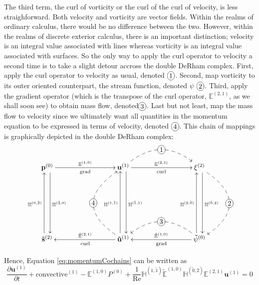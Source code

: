 The third term, the curl of vorticity or the curl of the curl of velocity, is less straighforward. Both velocity and vorticity are vector fields. Within the realms of ordinary calculus, there would be no difference between the two. However, within the realms of discrete exterior calculus, there is an important distinction; velocity is an integral value associated with lines whereas vorticity is an integral value associated with surfaces. So the only way to apply the curl operator to velocity a second time is to take a slight detour accross the double DeRham complex. First, apply the curl operator to velocity as usual, denoted $\xymatrix{*+[o][F-]{1}}$. Second, map vorticity to its outer oriented counterpart, the stream function, denoted $\psi$ $\xymatrix{*+[o][F-]{2}}$. Third, apply the gradient operator (which is the transpose of the curl operator, $\mathbb{E}^{(2,1)}$, as we shall soon see) to obtain mass flow, denoted$\xymatrix{*+[o][F-]{3}}$. Last but not least, map the mass flow to velocity since we ultimately want all quantities in the momentum equation to be expressed in terms of velocity, denoted $\xymatrix{*+[o][F-]{4}}$. This chain of mappings is graphically depicted in the double DeRham complex:
\begin{equation}
    \begin{gathered}
        \xymatrix@=20ex{
            \mathbf{p}^{(0)} \ar[r]^{\mathbb{E}^{(1,0)}}_{\text{grad}} \ar@<1ex>[d]^{\mathbb{H}^{(\tilde{2},0)}} & \mathbf{u}^{(1)} \ar[r]^{\mathbb{E}^{(2,1)}}_{\text{curl}} \ar @/^6ex/ @{-->} [r]|-*+[o][F-]{1} \ar@<1ex>[d]^{\mathbb{H}^{(\tilde{1},1)}} & \mathbf{\xi}^{(2)} \ar@<1ex>[d]^{\mathbb{H}^{(\tilde{0},2)}} \ar @/^10ex/ @{-->} [d]|-*+[o][F-]{2} \\
            \mathbf{\tilde{s}}^{(2)} \ar@<1ex>[u]^{\mathbb{H}^{(0,\tilde{2})}} & \mathbf{\tilde{u}}^{(1)} \ar[l]_{\tilde{\mathbb{E}}^{(2, 1)}}^{\text{curl}} \ar@<1ex>[u]^{\mathbb{H}^{(1,\tilde{1})}} \ar @/^10ex/ @{-->} [u]|-*+[o][F-]{4} & \mathbf{\tilde{\psi}}^{(0)} \ar[l]_{\tilde{\mathbb{E}}^{(1,0)}}^{\text{grad}} \ar @/_6ex/ @{-->} [l]|-*+[o][F-]{3} \ar@<1ex>[u]^{\mathbb{H}^{(2,\tilde{0})}}
        }
    \end{gathered}
\end{equation}

Hence, Equation \ref{eq:momentumCochains} can be written as
\begin{equation}
    \frac{\partial \mathbf{u}^{(1)}}{\partial t} + \text{convective}^{(1)} - \mathbb{E}^{(1,0)} P^{(0)} + \frac{1}{\text{Re}} \mathbb{H}^{(1,\tilde{1})} \tilde{\mathbb{E}}^{(1,0)} \mathbb{H}^{(\tilde{0},2)} \mathbb{E}^{(2,1)} \mathbf{u}^{(1)} = 0
\end{equation}

